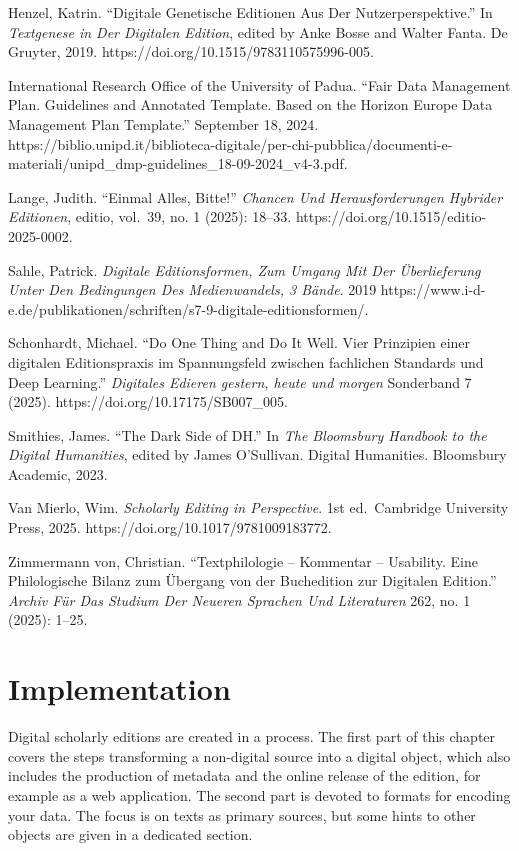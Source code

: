 \documentclass[
  letterpaper,
  DIV=11,
  numbers=noendperiod]{scrreprt}
\begin{document}
Henzel, Katrin. ``Digitale Genetische Editionen Aus Der
Nutzerperspektive.'' In \emph{Textgenese in Der Digitalen Edition},
edited by Anke Bosse and Walter Fanta. De Gruyter, 2019.
https://doi.org/10.1515/9783110575996-005.

International Research Office of the University of Padua. ``Fair Data
Management Plan. Guidelines and Annotated Template. Based on the Horizon
Europe Data Management Plan Template.'' September 18, 2024.
https://biblio.unipd.it/biblioteca-digitale/per-chi-pubblica/documenti-e-materiali/unipd\_dmp-guidelines\_18-09-2024\_v4-3.pdf.

Lange, Judith. ``Einmal Alles, Bitte!'' \emph{Chancen Und
Herausforderungen Hybrider Editionen}, editio, vol.~39, no. 1 (2025):
18--33. https://doi.org/10.1515/editio-2025-0002.

Sahle, Patrick. \emph{Digitale Editionsformen, Zum Umgang Mit Der
Überlieferung Unter Den Bedingungen Des Medienwandels, 3 Bände}. 2019
https://www.i-d-e.de/publikationen/schriften/s7-9-digitale-editionsformen/.

Schonhardt, Michael. ``Do One Thing and Do It Well. Vier Prinzipien
einer digitalen Editionspraxis im Spannungsfeld zwischen fachlichen
Standards und Deep Learning.'' \emph{Digitales Edieren gestern, heute
und morgen} Sonderband 7 (2025). https://doi.org/10.17175/SB007\_005.

Smithies, James. ``The Dark Side of DH.'' In \emph{The Bloomsbury
Handbook to the Digital Humanities}, edited by James O'Sullivan. Digital
Humanities. Bloomsbury Academic, 2023.

Van Mierlo, Wim. \emph{Scholarly Editing in Perspective}. 1st
ed.~Cambridge University Press, 2025.
https://doi.org/10.1017/9781009183772.

Zimmermann von, Christian. ``Textphilologie -- Kommentar -- Usability.
Eine Philologische Bilanz zum Übergang von der Buchedition zur Digitalen
Edition.'' \emph{Archiv Für Das Studium Der Neueren Sprachen Und
Literaturen} 262, no. 1 (2025): 1--25.


\chapter{Implementation}\label{implementation}

Digital scholarly editions are created in a process. The first part of
this chapter covers the steps transforming a non-digital source into a
digital object, which also includes the production of metadata and the
online release of the edition, for example as a web application. The
second part is devoted to formats for encoding your data. The focus is
on texts as primary sources, but some hints to other objects are given
in a dedicated section.
\end{document}
